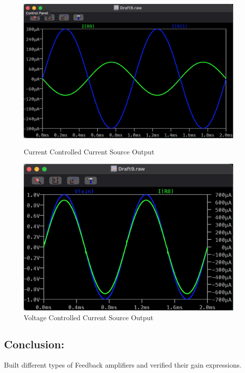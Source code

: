 \documentclass[a4paper,12pt]{report}
\begin{document}
\begin{figure}[h]
        \vspace{0.5cm}
        
        \begin{minipage}{0.45\textwidth}
            \centering
            \includegraphics[width=\linewidth]{../Img/E5OpCCCS}
            \caption{Current Controlled Current Source Output}
        \end{minipage}
        \hfill
        \begin{minipage}{0.45\textwidth}
            \centering
            \includegraphics[width=\linewidth]{../Img/E5OpVCCS}
            \caption{Voltage Controlled Current Source Output}
        \end{minipage}
    \end{figure}

  \vspace{0.3cm}

  \subsection{Conclusion:} 
    \hspace{20pt}Built different types of Feedback amplifiers and verified their gain expressions.

  \newpage
\end{document}
